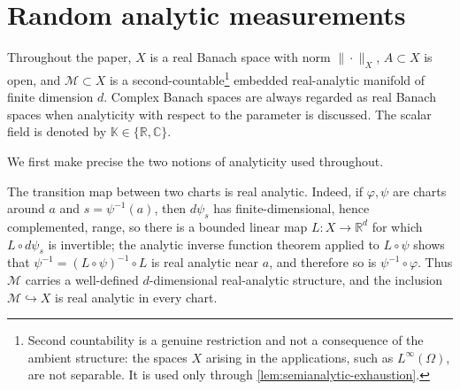 \documentclass[11pt,oneside]{amsart}
\theoremstyle{plain}
\theoremstyle{definition}
\newtheorem{definition}[theorem]{Definition}
\theoremstyle{remark}
\newcommand{\RR}{\mathbb{R}}
\newcommand{\CC}{\mathbb{C}}
\newcommand{\KK}{\mathbb{K}}
\newcommand{\norm}[1]{\left\lVert #1\right\rVert}
\newcommand{\calM}{\mathcal{M}}
\begin{document}
\section{Random analytic measurements}\label{sec:framework}

Throughout the paper, $X$ is a real Banach space with norm $\|\cdot\|_X$, $A\subset X$ is open, and $\calM\subset X$ is a second-countable\footnote{Second countability is a genuine restriction and not a consequence of the
ambient structure: the spaces $X$ arising in the applications, such as $L^\infty(\Omega)$,
are not separable. It is used only through \cref{lem:semianalytic-exhaustion}.} embedded real-analytic manifold of finite dimension $d$. Complex Banach spaces are always regarded as real Banach spaces when analyticity with respect to the parameter is discussed. The scalar field is denoted by $\KK\in\{\RR,\CC\}$.


We first make precise the two notions of analyticity used throughout.


The transition map between two charts is real analytic. Indeed, if $\varphi,\psi$ are
charts around $a$ and $s=\psi^{-1}(a)$, then $d\psi_s$ has finite-dimensional, hence
complemented, range, so there is a bounded linear map $L\colon X\to\RR^d$ for which
$L\circ d\psi_s$ is invertible; the analytic inverse function theorem applied to
$L\circ\psi$ shows that $\psi^{-1}=(L\circ\psi)^{-1}\circ L$ is real analytic near $a$,
and therefore so is $\psi^{-1}\circ\varphi$. Thus $\calM$ carries a well-defined
$d$-dimensional real-analytic structure, and the inclusion $\calM\hookrightarrow X$ is
real analytic in every chart.
\end{document}

